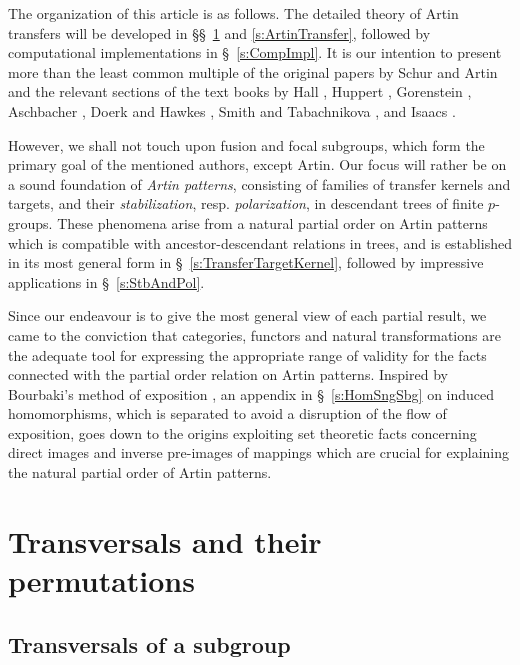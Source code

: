 \documentclass{amsart}
\theoremstyle{definition}
\numberwithin{equation}{section}
\begin{document}
The organization of this article is as follows.
The detailed theory of Artin transfers will be developed in \S\S\
\ref{s:TransversalsPermutations}
and
\ref{s:ArtinTransfer},
followed by computational implementations in \S\
\ref{s:CompImpl}.
It is our intention to present more than the least common multiple of
the original papers by Schur
\cite{Su}
and Artin
\cite{Ar2}
and the relevant sections of the text books by Hall
\cite{Hl},
Huppert
\cite{Hp},
Gorenstein
\cite{Gs},
Aschbacher
\cite{Ab},
Doerk and Hawkes
\cite{DkHw},
Smith and Tabachnikova
\cite{SmTb},
and Isaacs
\cite{Is}.

However, we shall not touch upon fusion and focal subgroups,
which form the primary goal of the mentioned authors, except Artin.
Our focus will rather be on a sound foundation
of \textit{Artin patterns}, consisting of families of transfer kernels and targets,
and their \textit{stabilization}, resp. \textit{polarization},
in descendant trees of finite \(p\)-groups.
These phenomena arise from a 
natural partial order on Artin patterns
which is compatible with ancestor-descendant relations in trees,
and is established in its most general form in \S\
\ref{s:TransferTargetKernel},
followed by impressive applications in \S\
\ref{s:StbAndPol}.

Since our endeavour is to give the most general view of each partial result,
we came to the conviction that categories, functors and natural transformations
are the adequate tool for expressing the appropriate range of validity for
the facts connected with the partial order relation on Artin patterns.
Inspired by Bourbaki's method of exposition
\cite{Bb},
an appendix in \S\
\ref{s:HomSngSbg}
on induced homomorphisms,
which is separated to avoid a disruption of the flow of exposition,
goes down to the origins exploiting set theoretic facts
concerning direct images and inverse pre-images of mappings
which are crucial for explaining the natural partial order of Artin patterns.



\section{Transversals and their permutations}
\label{s:TransversalsPermutations}

\subsection{Transversals of a subgroup}
\label{ss:Transversals}
\end{document}
